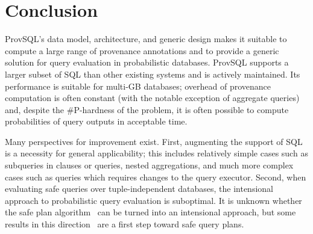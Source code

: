 \section{Conclusion}
\label{sec:conlusion}
ProvSQL's data model, architecture, and generic design makes it suitable
to compute a large range of provenance annotations
and to
provide a generic solution for query evaluation in probabilistic databases. ProvSQL supports
a larger subset of SQL than other existing systems and is actively
maintained. Its performance is suitable for multi-GB
databases; overhead of provenance computation is often
constant (with the notable exception of aggregate queries) and, despite
the \textsf{\#P}-hardness of the problem, it is often possible to compute
probabilities of query outputs in acceptable time.

Many perspectives for improvement exist. First, augmenting the support of
SQL is a necessity for general applicability; this includes
relatively simple cases such as subqueries in 
clauses or  queries, nested aggregations, and much more complex cases
such as  queries which requires changes to
the
query executor.
Second, when
evaluating safe queries over tuple-independent databases, the intensional
approach to probabilistic query evaluation is suboptimal. It is
unknown whether the safe plan algorithm~\cite{dalvi2013dichotomy}
can be turned into an intensional approach, but some results in this
direction~\cite{DBLP:conf/pods/Monet20} are a first step toward
safe query plans.
